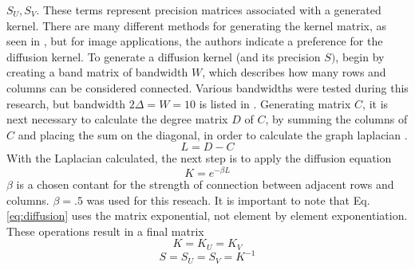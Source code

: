\documentclass[journal]{IEEEtran}
\begin{document}
\begin{math}S_U, S_V\end{math}. These terms represent precision matrices associated with a generated kernel. There are many different methods for
generating the kernel matrix, as seen in \cite{KPMFpaper}, but for image applications, the authors indicate a preference for the diffusion
kernel. To generate a diffusion kernel (and its precision \begin{math}S)\end{math}, begin by creating a band matrix of bandwidth \begin{math}W\end{math},
which describes how many rows and columns can be considered connected. Various bandwidths were tested during this research, but bandwidth 
\begin{math}2\Delta = W = 10\end{math} is listed in \cite{KPMFpaper}. Generating matrix \begin{math}C\end{math}, it is next necessary to calculate
the degree matrix \begin{math}D\end{math} of \begin{math}C\end{math}, by summing the columns of \begin{math}C\end{math} and placing the sum on the 
diagonal, in order to calculate the graph laplacian \cite{Laplacian}.
\begin{equation}
    L = D - C
\end{equation}
With the Laplacian calculated, the next step is to apply the diffusion equation 
\begin{equation}
K = e^{-\beta L}
\label{eq:diffusion}
\end{equation}
\begin{math}\beta\end{math} is a chosen contant for the strength of connection between adjacent rows and columns. 
\begin{math}\beta = .5\end{math} was used for this reseach.
It is important to note that Eq. \ref{eq:diffusion} uses the matrix exponential, not element by element exponentiation. 
These operations result in a final matrix 
\begin{equation}
K = K_U = K_V
\end{equation}
\begin{equation}
S = S_U = S_V = K^{-1}
\end{equation}
\end{document}
